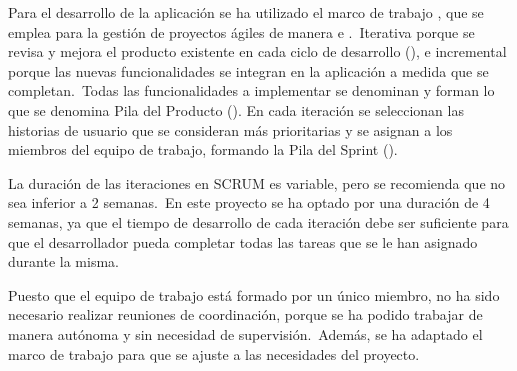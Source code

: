 
Para el desarrollo de la aplicación se ha utilizado el marco de trabajo , que se emplea para la gestión
de proyectos ágiles de manera  e .\ Iterativa porque se revisa y mejora
el producto existente en cada ciclo de desarrollo (), e incremental porque las nuevas
funcionalidades se integran en la aplicación a medida que se completan.\ Todas las funcionalidades a implementar se
denominan  y forman lo que se denomina Pila del Producto ().
En cada iteración se seleccionan las historias de usuario que se consideran más prioritarias y se asignan a los
miembros del equipo de trabajo, formando la Pila del Sprint ().

La duración de las iteraciones en SCRUM es variable, pero se recomienda que no sea inferior a 2 semanas.\ En este
proyecto se ha optado por una duración de 4 semanas, ya que el tiempo de desarrollo de cada iteración debe ser
suficiente para que el desarrollador pueda completar todas las tareas que se le han asignado durante la misma.

Puesto que el equipo de trabajo está formado por un único miembro, no ha sido necesario realizar reuniones de
coordinación, porque se ha podido trabajar de manera autónoma y sin necesidad de supervisión.\ Además, se ha
adaptado el marco de trabajo para que se ajuste a las necesidades del proyecto.
